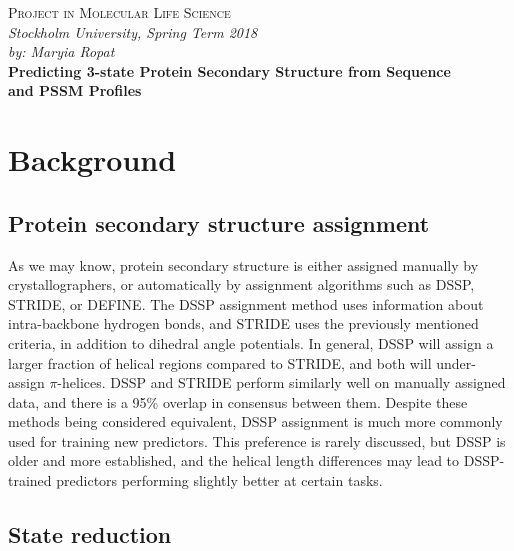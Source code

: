 \documentclass[12pt]{article}
\begin{document}
\begin{titlepage}
\begin{center}

\textsc{\LARGE Project in Molecular Life Science} \\[0.5cm]

\emph{ Stockholm University, Spring Term 2018 \\ by: Maryia Ropat } \\[3cm]

{\Huge \bfseries Predicting 3-state Protein Secondary Structure from Sequence \\ and PSSM Profiles} \\[7cm]

\vfill

\end{center}
\end{titlepage}

\newpage

\tableofcontents

\vfill

\newpage


\section{Background}

\subsection*{Protein secondary structure assignment}

As we may know, protein secondary structure is either assigned manually by crystallographers, or automatically by assignment algorithms such as DSSP, STRIDE, or DEFINE. 
The DSSP assignment method uses information about intra-backbone hydrogen bonds, and STRIDE uses the previously mentioned criteria, in addition to dihedral angle potentials. In general, DSSP will assign a larger fraction of helical regions compared to STRIDE, and both will under-assign $ \pi $-helices. DSSP and STRIDE perform similarly well on manually assigned data, and there is a 95\% overlap in consensus between them.
Despite these methods being considered equivalent, DSSP assignment is much more commonly used for training new predictors. This preference is rarely discussed, but DSSP is older and more established, and the helical length differences may lead to DSSP-trained predictors performing slightly better at certain tasks\cite{2}.
\subsection{State reduction}
\end{document}
